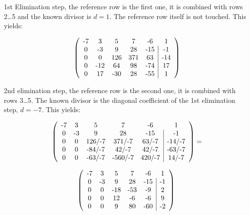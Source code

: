 \noindent
1st Elimination step, the reference row is the first one, it is combined
with rows 2\ldots5 and the known divisor is $d=1$. The reference row
itself is not touched. This yields:

\begin{displaymath}
\left(
\begin{array}{ccccc|c}
$-7$ &   $3$ &   $5$ &   $7$ &  $-6$ &   $1$ \\
 $0$ &  $-3$ &   $9$ &  $28$ & $-15$ &  $-1$ \\
 $0$ &   $0$ & $126$ & $371$ &  $63$ & $-14$ \\
 $0$ & $-12$ &  $64$ &  $98$ & $-74$ &  $17$ \\
 $0$ &  $17$ & $-30$ &  $28$ & $-55$ &   $1$
\end{array}
\right)
\end{displaymath}

\noindent
2nd elimination step, the reference row is the second one, it is combined
with rows 3\ldots5. The known divisor is the diagonal coefficient of the
1st elimination step, $d=-7$. This yields:

\begin{displaymath}
\left(
\begin{array}{ccccc|c}
$-7$ &  $3$ &   $5$    &    $7$    &  $-6$    &   $1$    \\
 $0$ & $-3$ &   $9$    &   $28$    & $-15$    &  $-1$    \\
 $0$ &  $0$ & $126/-7$ &  $371/-7$ &  $63/-7$ & $-14/-7$ \\
 $0$ &  $0$ & $-84/-7$ &   $42/-7$ &  $42/-7$ & $-63/-7$ \\
 $0$ &  $0$ & $-63/-7$ & $-560/-7$ & $420/-7$ &  $14/-7$
\end{array}
\right) =
\end{displaymath}

\begin{displaymath}
\left(
\begin{array}{ccccc|c}
$-7$ &  $3$ &   $5$ &   $7$ &  $-6$ &  $1$ \\
 $0$ & $-3$ &   $9$ &  $28$ & $-15$ & $-1$ \\
 $0$ &  $0$ & $-18$ & $-53$ &  $-9$ &  $2$ \\
 $0$ &  $0$ &  $12$ &  $-6$ &  $-6$ &  $9$ \\
 $0$ &  $0$ &   $9$ &  $80$ & $-60$ & $-2$
\end{array}
\right) \\
\end{displaymath}

